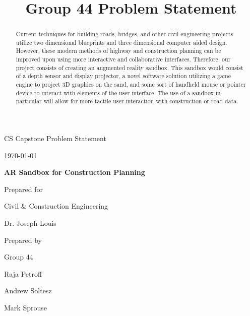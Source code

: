 \documentclass[onecolumn, draftclsnofoot,10pt, compsoc]{IEEEtran}
\title{Group 44 Problem Statement}
\def \CapstoneTeamName{		The Cleverly Named Team}
\def \CapstoneTeamNumber{		44}
\def \GroupMemberOne{			Raja Petroff}
\def \GroupMemberTwo{			Andrew Soltesz}
\def \GroupMemberThree{			Mark Sprouse}
\def \CapstoneProjectName{		AR Sandbox for Construction Planning}
\def \CapstoneSponsorCompany{	Civil \& Construction Engineering}
\def \CapstoneSponsorPerson{		Dr. Joseph Louis}
\def \DocType{		Problem Statement
				}
\newcommand{\NameSigPair}[1]{\par
\makebox[2.75in][r]{#1} \hfil 	\makebox[3.25in]{\makebox[2.25in]{\hrulefill} \hfill		\makebox[.75in]{\hrulefill}}
\par\vspace{-12pt} \textit{\tiny\noindent
\makebox[2.75in]{} \hfil		\makebox[3.25in]{\makebox[2.25in][r]{Signature} \hfill	\makebox[.75in][r]{Date}}}}
\renewcommand{\NameSigPair}[1]{#1}
\begin{document}
\begin{titlepage}
    \begin{singlespace}
        \hfill 
        \par\vspace{.2in}
        \centering
        \scshape{
            \huge CS Capstone \DocType \par
            {\large\today}\par
            \vspace{.5in}
            \textbf{\Huge\CapstoneProjectName}\par
            \vfill
            {\large Prepared for}\par
            \Huge \CapstoneSponsorCompany\par
            \vspace{5pt}
            {\Large\NameSigPair{\CapstoneSponsorPerson}\par}
            {\large Prepared by }\par
            Group\CapstoneTeamNumber\par
            \vspace{5pt}
            {\Large
                \NameSigPair{\GroupMemberOne}\par
                \NameSigPair{\GroupMemberTwo}\par
                \NameSigPair{\GroupMemberThree}\par
            }
            \vspace{20pt}
        }
        \begin{abstract}
        	Current techniques for building roads, bridges, and other civil engineering projects utilize two dimensional blueprints and three dimensional computer aided design.
			However, these modern methods of highway and construction planning can be improved upon using more interactive and collaborative interfaces.
			Therefore, our project consists of creating an augmented reality sandbox.
			This sandbox would consist of a depth sensor and display projector, a novel software solution utilizing a game engine to project 3D graphics on the sand, and some sort of handheld mouse or pointer device to interact with elements of the user interface.
			The use of a sandbox in particular will allow for more tactile user interaction with construction or road data.
        \end{abstract}     
    \end{singlespace}
\end{titlepage}
\newpage
{}
\tableofcontents
\clearpage
\end{document}
